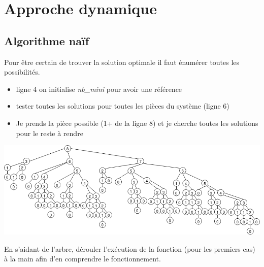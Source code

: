 \documentclass[a4paper,11pt]{article}
\begin{document}
\section{Approche dynamique}
\subsection{Algorithme naïf}
Pour être certain de trouver la solution optimale il faut énumérer toutes les possibilités.
\begin{center}
    
    \label{naif}
\end{center}
\begin{commentprof}
\begin{itemize}
    \item ligne 4 on initialise \emph{nb\_mini} pour avoir une référence
    \item tester toutes les solutions pour toutes les pièces du système (ligne 6)
    \item Je prends la pièce possible (1+ de la ligne 8) et je cherche toutes les solutions pour le reste à rendre
\end{itemize}
\end{commentprof}
\begin{center}
    \centering
    \includegraphics[width=17cm]{ressources/appel-naif-8.png}
    \label{IMG}
\end{center}
\begin{activite}
En s'aidant de l'arbre, dérouler l'exécution de la fonction (pour les premiers cas) à la main afin d'en comprendre le fonctionnement.
\end{activite}
\end{document}
